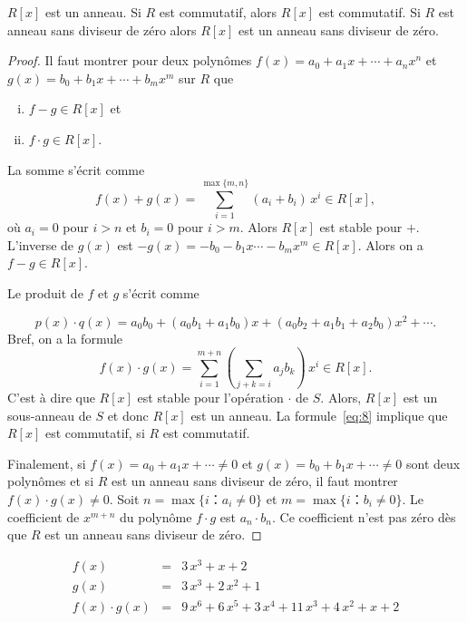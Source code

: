 \begin{theorem}
  \label{thr:51}
  $R[x]$ est un anneau. Si $R$ est commutatif, alors $R[x]$ est commutatif. Si $R$ est anneau sans diviseur de zéro    alors $R[x]$ est un  anneau sans diviseur de zéro. 
\end{theorem}
\begin{proof}
  Il faut montrer
  pour deux polynômes $f(x) = a_0 + a_1 x + \cdots + a_n x^n$ et $g(x) = b_0 + b_1x + \cdots + b_m x^m$ sur $R$ que
  \begin{enumerate}[i)]
  \item $f- g ∈ R[x]$ et
  \item $f ⋅ g ∈R[x]$. 
  \end{enumerate}
  La somme s'écrit comme
  \begin{equation}
    \label{eq:47}
    f(x) + g(x) = ∑_{i=1}^{\max\{m,n\}} (a_i +  b_i) \, x^i  ∈R[x], 
  \end{equation}
  où $a_i = 0$ pour $i>n$ et $b_i = 0$ pour $i>m$. 
  Alors   $R[x]$ est stable pour $+$. 
  L'inverse de $g(x)$ est $-g(x) = -b_0 - b_1 x  \cdots - b_m x^m ∈ R[x]$. Alors
  on a $f-g ∈ R[x]$. 
  
  Le    produit de $f$ et $g$ s'écrit comme

  \begin{equation}
  \label{ceq:21}
  p(x) ⋅q(x) = a_0 b_0 + (a_0b_1 +a_1b_0) x + (a_0b_2+ a_1b_1 + a_2b_0)x^2 + \cdots .
\end{equation}
Bref, on a la formule 
  \begin{equation}
    \label{eq:8}
    f(x) ⋅g(x) = ∑_{i=1}^{m+n} ( ∑_{j+k = i} a_j b_k) \, x^i ∈ R[x]. 
  \end{equation}
  C'est à dire que $R[x]$ est stable pour l'opération $⋅$ de $S$.  Alors, $R[x]$ est un sous-anneau de $S$ et 
  donc $R[x]$ est un anneau. La formule~\eqref{eq:8} implique que
  $R[x]$ est commutatif, si $R$ est commutatif.

  Finalement, si $f(x) = a_0 + a_1 x + \cdots ≠ 0$ et
  $g(x) = b_0 + b_1 x + \cdots ≠ 0 $ sont deux polynômes et si $R$ est un 
  anneau sans diviseur de zéro, il faut montrer $f(x) ⋅ g(x) ≠
  0$. Soit $n = \max\{ i ：a_i ≠0 \}$ et $m = \max\{ i ：b_i ≠0 \}$. Le coefficient de $x^{m+n}$ du polynôme $f⋅g$ est $a_n ⋅b_n$. Ce coefficient n'est pas zéro dès que $R$  est un 
  anneau sans diviseur de zéro. 
\end{proof}

\begin{example}
  \label{exe:33}
  \begin{eqnarray*}
    f(x) & = &  3 \, x^{3} + x + 2 \\
    g(x) & = & 3 \, x^{3} + 2 \, x^{2} + 1 \\
    f(x) ⋅g(x) & = & 9 \, x^{6} + 6 \, x^{5} + 3 \, x^{4} + 11 \, x^{3} + 4 \,  x^{2} + x + 2 \\ 
  \end{eqnarray*}
\end{example}


